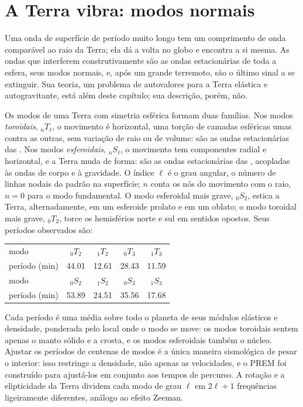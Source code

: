 \section{A Terra vibra: modos normais}

Uma onda de superfície de período muito longo tem um comprimento de onda comparável ao
raio da Terra; ela dá a volta no globo e encontra a si mesma. As ondas que
interferem construtivamente são as ondas estacionárias de toda a esfera, seus modos normais,
e, após um grande terremoto, são o último sinal a se extinguir.
Sua teoria, um problema de autovalores para a Terra elástica e autogravitante, está
além deste capítulo; sua descrição, porém, não.

Os modos de uma Terra com simetria esférica formam duas famílias. Nos
modos \emph{toroidais}, ${}_nT_\ell$, o movimento é horizontal, uma torção de
camadas esféricas umas contra as outras, sem variação de raio ou de volume: são as
ondas estacionárias das . Nos modos \emph{esferoidais}, ${}_nS_\ell$,
o movimento tem componentes radial e horizontal, e a Terra muda de forma: são as
ondas estacionárias das , acopladas às ondas de corpo e à gravidade.
O índice $\ell$ é o grau angular, o número de linhas nodais do
padrão na superfície; $n$ conta os nós do movimento com o raio, $n = 0$
para o modo fundamental. O modo esferoidal mais grave, ${}_0S_2$, estica a
Terra, alternadamente, em um esferoide prolato e em um oblato; o modo toroidal mais grave,
${}_0T_2$, torce os hemisférios norte e sul em
sentidos opostos. Seus períodos observados são:
\begin{center}
\small
\begin{tabular}{lcccc}
\hline
modo & ${}_0T_2$ & ${}_1T_2$ & ${}_0T_3$ & ${}_1T_3$ \\
período (\unit{min}) & 44.01 & 12.61 & 28.43 & 11.59 \\
\hline
modo & ${}_0S_2$ & ${}_1S_2$ & ${}_0S_3$ & ${}_1S_3$ \\
período (\unit{min}) & 53.89 & 24.51 & 35.56 & 17.68 \\
\hline
\end{tabular}
\end{center}
Cada período é uma média sobre todo o planeta de seus módulos elásticos e
densidade, ponderada pelo local onde o modo se move: os modos toroidais sentem apenas o
manto sólido e a crosta, e os modos esferoidais também o núcleo. Ajustar os
períodos de centenas de modos é a única maneira sismológica de pesar o
interior: isso restringe a densidade, não apenas as velocidades, e o PREM foi construído para
ajustá-los em conjunto aos tempos de percurso. A rotação e a elipticidade da
Terra dividem cada modo de grau $\ell$ em $2\ell + 1$ frequências ligeiramente
diferentes, análogo ao efeito Zeeman.

